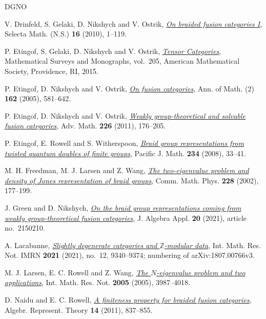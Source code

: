 \documentclass[11pt,oneside]{amsart}
\theoremstyle{remark}
\begin{document}
\begin{thebibliography}{DGNO}

V. Drinfeld, S. Gelaki, D. Nikshych and V. Ostrik,
\href{https://arxiv.org/abs/0906.0620}{\emph{On braided fusion categories I}},
Selecta Math. (N.S.) \textbf{16} (2010), 1--119.

P. Etingof, S. Gelaki, D. Nikshych and V. Ostrik,
\href{https://doi.org/10.1090/surv/205}{\emph{Tensor Categories}},
Mathematical Surveys and Monographs, vol.~205,
American Mathematical Society, Providence, RI, 2015.

P. Etingof, D. Nikshych and V. Ostrik,
\href{https://doi.org/10.4007/annals.2005.162.581}{\emph{On fusion categories}},
Ann. of Math. (2) \textbf{162} (2005), 581--642.

P. Etingof, D. Nikshych and V. Ostrik,
\href{https://arxiv.org/abs/0809.3031}{\emph{Weakly group-theoretical and solvable fusion categories}},
Adv. Math. \textbf{226} (2011), 176--205.

P. Etingof, E. Rowell and S. Witherspoon,
\href{https://arxiv.org/abs/math/0703274}{\emph{Braid group representations from twisted quantum doubles of finite groups}},
Pacific J. Math. \textbf{234} (2008), 33--41.

M. H. Freedman, M. J. Larsen and Z. Wang,
\href{https://arxiv.org/abs/math/0103200}{\emph{The two-eigenvalue problem and density of Jones representation of braid groups}},
Comm. Math. Phys. \textbf{228} (2002), 177--199.

J. Green and D. Nikshych,
\href{https://arxiv.org/abs/1911.02633}{\emph{On the braid group representations coming from weakly group-theoretical
fusion categories}},
J. Algebra Appl. \textbf{20} (2021), article no.~2150210.

A. Lacabanne,
\href{https://arxiv.org/abs/1807.00766}{\emph{Slightly degenerate categories and $\mathbb Z$-modular data}},
Int. Math. Res. Not. IMRN \textbf{2021} (2021), no.~12, 9340--9374; numbering
of arXiv:1807.00766v3.

M. J. Larsen, E. C. Rowell and Z. Wang,
\href{https://arxiv.org/abs/math/0506025}{\emph{The $N$-eigenvalue problem and two applications}},
Int. Math. Res. Not. \textbf{2005} (2005), 3987--4018.

D. Naidu and E. C. Rowell,
\href{https://arxiv.org/abs/0903.4157}{\emph{A finiteness property for braided fusion categories}},
Algebr. Represent. Theory \textbf{14} (2011), 837--855.

\end{thebibliography}
\end{document}
